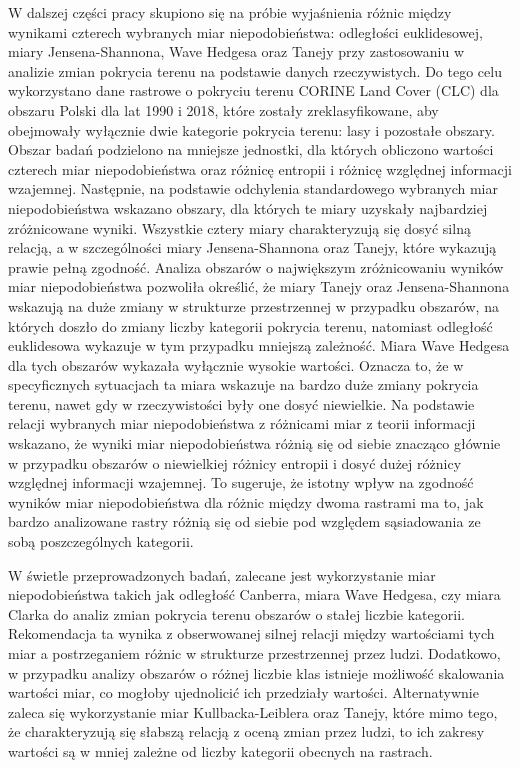 \documentclass{amuthesis}
\begin{document}
W dalszej części pracy skupiono się na próbie wyjaśnienia różnic między
wynikami czterech wybranych miar niepodobieństwa: odległości
euklidesowej, miary Jensena-Shannona, Wave Hedgesa oraz Tanejy przy
zastosowaniu w analizie zmian pokrycia terenu na podstawie danych
rzeczywistych. Do tego celu wykorzystano dane rastrowe o pokryciu terenu
CORINE Land Cover (CLC) dla obszaru Polski dla lat 1990 i 2018, które
zostały zreklasyfikowane, aby obejmowały wyłącznie dwie kategorie
pokrycia terenu: lasy i pozostałe obszary. Obszar badań podzielono na
mniejsze jednostki, dla których obliczono wartości czterech miar
niepodobieństwa oraz różnicę entropii i różnicę względnej informacji
wzajemnej. Następnie, na podstawie odchylenia standardowego wybranych
miar niepodobieństwa wskazano obszary, dla których te miary uzyskały
najbardziej zróżnicowane wyniki. Wszystkie cztery miary charakteryzują
się dosyć silną relacją, a w szczególności miary Jensena-Shannona oraz
Tanejy, które wykazują prawie pełną zgodność. Analiza obszarów o
największym zróżnicowaniu wyników miar niepodobieństwa pozwoliła
określić, że miary Tanejy oraz Jensena-Shannona wskazują na duże zmiany
w strukturze przestrzennej w przypadku obszarów, na których doszło do
zmiany liczby kategorii pokrycia terenu, natomiast odległość euklidesowa
wykazuje w tym przypadku mniejszą zależność. Miara Wave Hedgesa dla tych
obszarów wykazała wyłącznie wysokie wartości. Oznacza to, że w
specyficznych sytuacjach ta miara wskazuje na bardzo duże zmiany
pokrycia terenu, nawet gdy w rzeczywistości były one dosyć niewielkie.
Na podstawie relacji wybranych miar niepodobieństwa z różnicami miar z
teorii informacji wskazano, że wyniki miar niepodobieństwa różnią się od
siebie znacząco głównie w przypadku obszarów o niewielkiej różnicy
entropii i dosyć dużej różnicy względnej informacji wzajemnej. To
sugeruje, że istotny wpływ na zgodność wyników miar niepodobieństwa dla
różnic między dwoma rastrami ma to, jak bardzo analizowane rastry różnią
się od siebie pod względem sąsiadowania ze sobą poszczególnych
kategorii.

W świetle przeprowadzonych badań, zalecane jest wykorzystanie miar
niepodobieństwa takich jak odległość Canberra, miara Wave Hedgesa, czy
miara Clarka do analiz zmian pokrycia terenu obszarów o stałej liczbie
kategorii. Rekomendacja ta wynika z obserwowanej silnej relacji między
wartościami tych miar a postrzeganiem różnic w strukturze przestrzennej
przez ludzi. Dodatkowo, w przypadku analizy obszarów o różnej liczbie
klas istnieje możliwość skalowania wartości miar, co mogłoby ujednolicić
ich przedziały wartości. Alternatywnie zaleca się wykorzystanie miar
Kullbacka-Leiblera oraz Tanejy, które mimo tego, że charakteryzują się
słabszą relacją z oceną zmian przez ludzi, to ich zakresy wartości są w
mniej zależne od liczby kategorii obecnych na rastrach.
\end{document}
